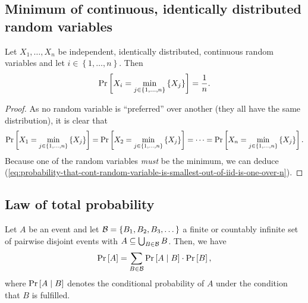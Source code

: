 
\subsection{Minimum of continuous, identically distributed random variables}
\label{sec:probability-misc}

\begin{theorem}
  \label{thm:iid-cont-rand-var-minimum}
  Let $X_1,\dots,X_n$ be independent, identically distributed, continuous random variables and let $i\in\left\{ 1,\dots,n \right\}$. Then 
  \begin{equation}
    \label{eq:probability-that-cont-random-variable-is-smallest-out-of-iid-is-one-over-n}
    \operatorname{Pr}\left[X_i = \min_{j\in\left\{ 1,\dots,n \right\}}\left\{ X_j \right\}\right] = \frac{1}{n}.
  \end{equation}
\end{theorem}

\begin{proof}
  As no random variable is ``preferred'' over another (they all have the same distribution), it is clear that
  \begin{equation*}
    \operatorname{Pr}\left[X_1 = \min_{j\in\left\{ 1,\dots,n \right\}}\left\{ X_j \right\}\right] = \operatorname{Pr}\left[X_2 = \min_{j\in\left\{ 1,\dots,n \right\}}\left\{ X_j \right\}\right] = \dots = \operatorname{Pr}\left[X_n = \min_{j\in\left\{ 1,\dots,n \right\}}\left\{ X_j \right\}\right].
  \end{equation*}
  Because one of the random variables \emph{must} be the minimum, we can deduce
  (\ref{eq:probability-that-cont-random-variable-is-smallest-out-of-iid-is-one-over-n}).
\end{proof}

\subsection{Law of total probability}
\label{sec:theory-law-total-probability}

\begin{theorem}
  \label{theo:law-total-prob}
  Let $A$ be an event and let ${\cal B}=\left\{ B_1,B_2,B_3,\dots \right\}$ a finite or countably infinite set of pairwise disjoint events with $A \subseteq \bigcup_{B \in {\cal B}} B$. Then, we have
  \begin{equation*}
    \operatorname{Pr}\left[A\right] = \sum_{B\in{\cal B}} \operatorname{Pr}\left[A \mid B\right] \cdot \operatorname{Pr}\left[B\right],
  \end{equation*}
  where $\operatorname{Pr}\left[A \mid B\right]$ denotes the conditional probability of $A$ under the condition that $B$ is fulfilled.
\end{theorem}

